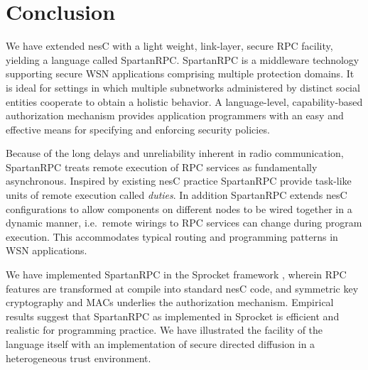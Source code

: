\section{Conclusion}

We have extended nesC with a light weight, link-layer, secure RPC facility, yielding a language
called SpartanRPC. SpartanRPC is a middleware technology supporting secure WSN applications
comprising multiple protection domains. It is ideal for settings in which multiple subnetworks
administered by distinct social entities cooperate to obtain a holistic behavior. A
language-level, capability-based authorization mechanism provides application programmers with
an easy and effective means for specifying and enforcing security policies.

Because of the long delays and unreliability inherent in radio communication, SpartanRPC treats
remote execution of RPC services as fundamentally asynchronous. Inspired by existing nesC
practice SpartanRPC provide task-like units of remote execution called \emph{duties}. In
addition SpartanRPC extends nesC configurations to allow components on different nodes to be
wired together in a dynamic manner, i.e.~remote wirings to RPC services can change during
program execution. This accommodates typical routing and programming patterns in WSN
applications.

We have implemented SpartanRPC in the Sprocket framework \cite{sprocket}, wherein RPC features
are transformed at compile into standard nesC code, and symmetric key cryptography and MACs
underlies the authorization mechanism. Empirical results suggest that SpartanRPC as implemented
in Sprocket is efficient and realistic for programming practice. We have illustrated the
facility of the language itself with an implementation of secure directed diffusion in a
heterogeneous trust environment.
